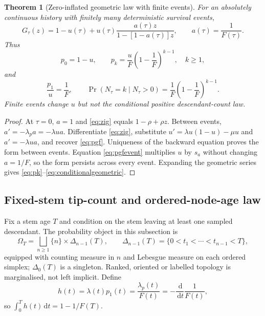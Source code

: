 \documentclass[11pt]{article}
\newtheorem{theorem}{Theorem}
\theoremstyle{definition}
\newcommand{\dd}{\,\mathrm{d}}
\begin{document}
\begin{theorem}[Zero-inflated geometric law with finite events]\label{thm:geometric}
For an absolutely continuous history with finitely many deterministic survival events,
\begin{equation}
 G_\tau(z)=1-u(\tau)+u(\tau)
 \frac{a(\tau)z}{1-[1-a(\tau)]z},
 \qquad a(\tau)=\frac1{F(\tau)}. \label{eq:zig}
\end{equation}
Thus
\begin{equation}
 p_0=1-u,\qquad p_k=\frac{u}{F}\left(1-\frac1F\right)^{k-1},\quad k\geq1, \label{eq:pk}
\end{equation}
and
\begin{equation}
 \frac{p_1}{u}=\frac1F,\qquad
 \Pr(N_\tau=k\mid N_\tau>0)=\frac1F\left(1-\frac1F\right)^{k-1}. \label{eq:conditionalgeometric}
\end{equation}
Finite events change $u$ but not the conditional positive descendant-count law.
\end{theorem}

\begin{proof}
At $\tau=0$, $a=1$ and \eqref{eq:zig} equals $1-\rho+\rho z$. Between events, $a'=-\lambda_pa=-\lambda ua$. Differentiate \eqref{eq:zig}, substitute $u'=\lambda u(1-u)-\mu u$ and $a'=-\lambda ua$, and recover \eqref{eq:pgf}. Uniqueness of the backward equation proves the form between events. Equation \eqref{eq:pgfevent} multiplies $u$ by $s_a$ without changing $a=1/F$, so the form persists across every event. Expanding the geometric series gives \eqref{eq:pk}--\eqref{eq:conditionalgeometric}.
\end{proof}

\subsection{Fixed-stem tip-count and ordered-node-age law}
Fix a stem age $T$ and condition on the stem leaving at least one sampled descendant. The probability object in this subsection is
\[
 \Omega_T=\bigsqcup_{n\geq1}\{n\}\times\Delta_{n-1}(T),\qquad
 \Delta_{n-1}(T)=\{0<t_1<\cdots<t_{n-1}<T\},
\]
equipped with counting measure in $n$ and Lebesgue measure on each ordered simplex; $\Delta_0(T)$ is a singleton. Ranked, oriented or labelled topology is marginalised, not left implicit. Define
\begin{equation}
 h(t)=\lambda(t)p_1(t)=\frac{\lambda_p(t)}{F(t)}=-\frac{\dd}{\dd t}\frac1{F(t)}, \label{eq:h}
\end{equation}
so $\int_0^T h(t)\dd t=1-1/F(T)$.
\end{document}
